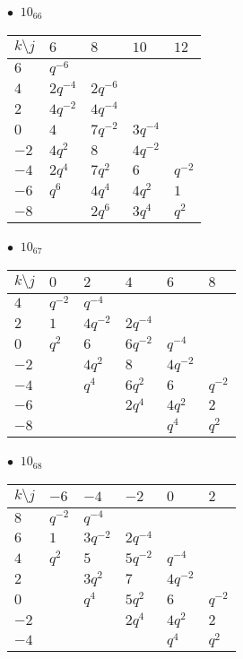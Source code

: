 \begin{minipage}{\linewidth}
$\bullet\ $ $10_{66}$ \vspace{0.5em} \\
\begin{tabular}{l|llll}
$k \setminus j$ & $6$ & $8$ & $10$ & $12$ \\
\hline
$6$ & $q^{-6}$ &  &  &  \\
$4$ & $2q^{-4}$ & $2q^{-6}$ &  &  \\
$2$ & $4q^{-2}$ & $4q^{-4}$ &  &  \\
$0$ & $4$ & $7q^{-2}$ & $3q^{-4}$ &  \\
$-2$ & $4q^{2}$ & $8$ & $4q^{-2}$ &  \\
$-4$ & $2q^{4}$ & $7q^{2}$ & $6$ & $q^{-2}$ \\
$-6$ & $q^{6}$ & $4q^{4}$ & $4q^{2}$ & $1$ \\
$-8$ &  & $2q^{6}$ & $3q^{4}$ & $q^{2}$ \\
\end{tabular}
\vspace{2em}
\end{minipage}
%
\begin{minipage}{\linewidth}
$\bullet\ $ $10_{67}$ \vspace{0.5em} \\
\begin{tabular}{l|lllll}
$k \setminus j$ & $0$ & $2$ & $4$ & $6$ & $8$ \\
\hline
$4$ & $q^{-2}$ & $q^{-4}$ &  &  &  \\
$2$ & $1$ & $4q^{-2}$ & $2q^{-4}$ &  &  \\
$0$ & $q^{2}$ & $6$ & $6q^{-2}$ & $q^{-4}$ &  \\
$-2$ &  & $4q^{2}$ & $8$ & $4q^{-2}$ &  \\
$-4$ &  & $q^{4}$ & $6q^{2}$ & $6$ & $q^{-2}$ \\
$-6$ &  &  & $2q^{4}$ & $4q^{2}$ & $2$ \\
$-8$ &  &  &  & $q^{4}$ & $q^{2}$ \\
\end{tabular}
\vspace{2em}
\end{minipage}
%
\begin{minipage}{\linewidth}
$\bullet\ $ $10_{68}$ \vspace{0.5em} \\
\begin{tabular}{l|lllll}
$k \setminus j$ & $-6$ & $-4$ & $-2$ & $0$ & $2$ \\
\hline
$8$ & $q^{-2}$ & $q^{-4}$ &  &  &  \\
$6$ & $1$ & $3q^{-2}$ & $2q^{-4}$ &  &  \\
$4$ & $q^{2}$ & $5$ & $5q^{-2}$ & $q^{-4}$ &  \\
$2$ &  & $3q^{2}$ & $7$ & $4q^{-2}$ &  \\
$0$ &  & $q^{4}$ & $5q^{2}$ & $6$ & $q^{-2}$ \\
$-2$ &  &  & $2q^{4}$ & $4q^{2}$ & $2$ \\
$-4$ &  &  &  & $q^{4}$ & $q^{2}$ \\
\end{tabular}
\vspace{2em}
\end{minipage}
